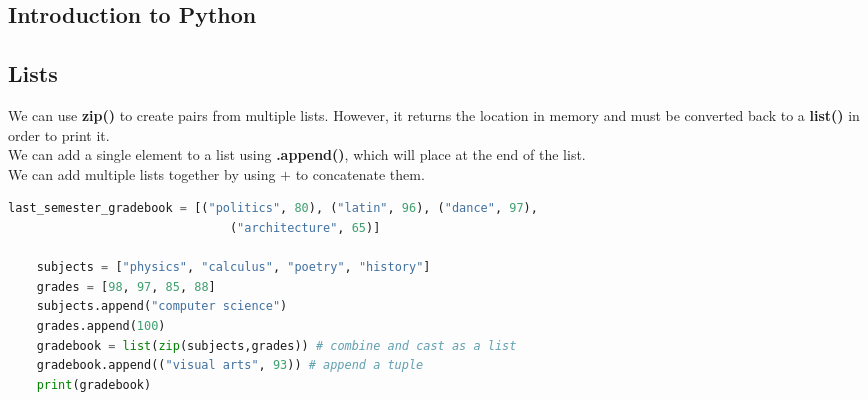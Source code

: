 \documentclass[11pt, a4paper]{article}
\begin{document}
\begin{spacing}{1.1}
	
	\section{Introduction to Python}
	\subsection{Lists}
	We can use \textbf{zip()} to create pairs from multiple lists. However, it returns the location in memory and must be converted back to a \textbf{list()} in order to print it.\\ 
	We can add a single element to a list using \textbf{.append()}, which will place at the end of the list. \\
	We can add multiple lists together by using $\bm{+}$ to concatenate them.
	\begin{lstlisting}[language=Python]
	last_semester_gradebook = [("politics", 80), ("latin", 96), ("dance", 97), 
	                           ("architecture", 65)]
	
	subjects = ["physics", "calculus", "poetry", "history"]
	grades = [98, 97, 85, 88]
	subjects.append("computer science")
	grades.append(100)
	gradebook = list(zip(subjects,grades)) # combine and cast as a list
	gradebook.append(("visual arts", 93)) # append a tuple
	print(gradebook)
	

\end{lstlisting}
\end{spacing}
\end{document}
